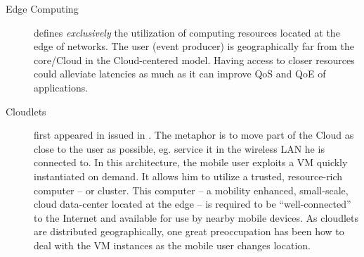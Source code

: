 \documentclass[11pt]{sdm}
\begin{document}
\begin{description}
	\item[Edge Computing] defines \emph{exclusively} the utilization of computing resources located at the edge of networks. The user (event producer) is geographically far from the core/Cloud in the Cloud-centered model. Having access to closer resources could alleviate latencies as much as it can improve \gls{QoS} and \gls{QoE} of applications.
		
	\item[Cloudlets] first appeared in \cite{satyanarayanan_case_2009} issued in . The metaphor is to move part of the Cloud as close to the user as possible, eg. service it in the wireless LAN he is connected to. In this architecture, the mobile user exploits a \gls{VM} quickly instantiated on demand. It allows him to utilize a trusted, resource-rich computer -- or cluster. This computer -- a mobility enhanced, small-scale, cloud data-center located at the edge -- is required to be ``well-connected'' to the Internet and available for use by nearby mobile devices. As cloudlets are distributed geographically, one great preoccupation has been how to deal with the \gls{VM} instances as the mobile user changes location.
	

\end{description}
\end{document}
